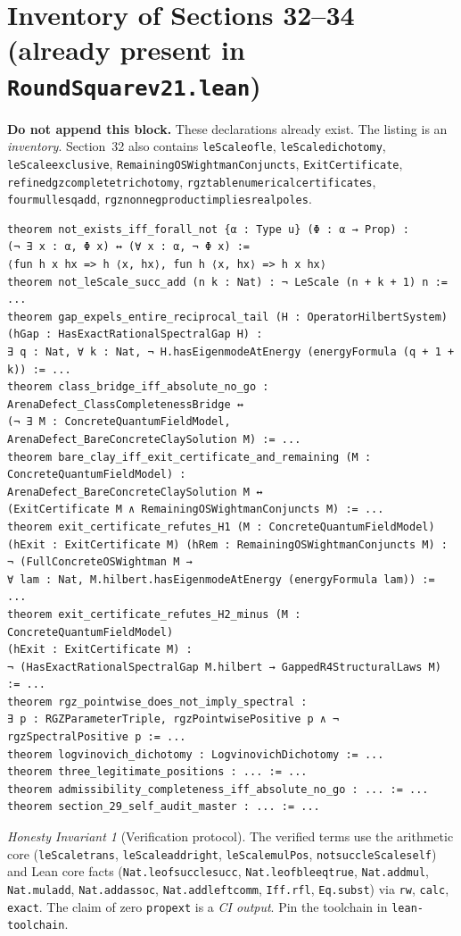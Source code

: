 \documentclass[11pt,a4paper]{article}
\theoremstyle{plain}
\theoremstyle{definition}
\theoremstyle{remark}
\newtheorem{invariant}[theorem]{Honesty Invariant}
\renewcommand{\_}{\oldunderscore\allowbreak}
\newcommand{\Lean}[1]{\texttt{\small #1}}
\begin{document}
\section{Inventory of Sections 32--34 (already present in \texttt{RoundSquare\_v21.lean})}
\label{sec:patch}
\textbf{Do not append this block.} These declarations already exist. The listing is an
\emph{inventory}. Section~32 also contains \Lean{leScale\_of\_le}, \Lean{leScale\_dichotomy},
\Lean{leScale\_exclusive}, \Lean{RemainingOSWightmanConjuncts}, \Lean{ExitCertificate},
\Lean{refined\_gz\_complete\_trichotomy}, \Lean{rgz\_table\_numerical\_certificates},
\Lean{four\_mul\_le\_sq\_add}, \Lean{rgz\_nonneg\_product\_implies\_real\_poles}.
\begin{lstlisting}
theorem not_exists_iff_forall_not {α : Type u} (Φ : α → Prop) :
(¬ ∃ x : α, Φ x) ↔ (∀ x : α, ¬ Φ x) :=
⟨fun h x hx => h ⟨x, hx⟩, fun h ⟨x, hx⟩ => h x hx⟩
theorem not_leScale_succ_add (n k : Nat) : ¬ LeScale (n + k + 1) n := ...
theorem gap_expels_entire_reciprocal_tail (H : OperatorHilbertSystem)
(hGap : HasExactRationalSpectralGap H) :
∃ q : Nat, ∀ k : Nat, ¬ H.hasEigenmodeAtEnergy (energyFormula (q + 1 + k)) := ...
theorem class_bridge_iff_absolute_no_go :
ArenaDefect_ClassCompletenessBridge ↔
(¬ ∃ M : ConcreteQuantumFieldModel, ArenaDefect_BareConcreteClaySolution M) := ...
theorem bare_clay_iff_exit_certificate_and_remaining (M : ConcreteQuantumFieldModel) :
ArenaDefect_BareConcreteClaySolution M ↔
(ExitCertificate M ∧ RemainingOSWightmanConjuncts M) := ...
theorem exit_certificate_refutes_H1 (M : ConcreteQuantumFieldModel)
(hExit : ExitCertificate M) (hRem : RemainingOSWightmanConjuncts M) :
¬ (FullConcreteOSWightman M →
∀ lam : Nat, M.hilbert.hasEigenmodeAtEnergy (energyFormula lam)) := ...
theorem exit_certificate_refutes_H2_minus (M : ConcreteQuantumFieldModel)
(hExit : ExitCertificate M) :
¬ (HasExactRationalSpectralGap M.hilbert → GappedR4StructuralLaws M) := ...
theorem rgz_pointwise_does_not_imply_spectral :
∃ p : RGZParameterTriple, rgzPointwisePositive p ∧ ¬ rgzSpectralPositive p := ...
theorem logvinovich_dichotomy : LogvinovichDichotomy := ...
theorem three_legitimate_positions : ... := ...
theorem admissibility_completeness_iff_absolute_no_go : ... := ...
theorem section_29_self_audit_master : ... := ...
\end{lstlisting}
\begin{invariant}[Verification protocol]
The verified terms use the arithmetic core (\Lean{leScale\_trans}, \Lean{leScale\_add\_right},
\Lean{leScale\_mulPos}, \Lean{not\_succ\_leScale\_self}) and Lean core facts
(\Lean{Nat.le\_of\_succ\_le\_succ}, \Lean{Nat.le\_of\_ble\_eq\_true}, \Lean{Nat.add\_mul},
\Lean{Nat.mul\_add}, \Lean{Nat.add\_assoc}, \Lean{Nat.add\_left\_comm}, \Lean{Iff.rfl},
\Lean{Eq.subst}) via \texttt{rw}, \texttt{calc}, \texttt{exact}. The claim of zero
\texttt{propext} is a \emph{CI output}. Pin the toolchain in \texttt{lean-toolchain}.
\end{invariant}
\end{document}
